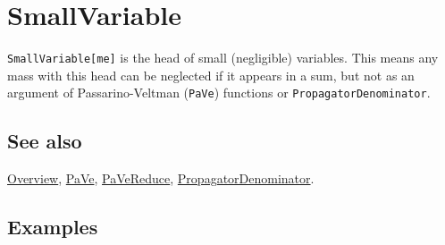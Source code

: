 \documentclass[../FeynCalcManual.tex]{subfiles}
\begin{document}
\hypertarget{smallvariable}{%
\section{SmallVariable}\label{smallvariable}}

\texttt{SmallVariable[\allowbreak{}me]} is the head of small
(negligible) variables. This means any mass with this head can be
neglected if it appears in a sum, but not as an argument of
Passarino-Veltman (\texttt{PaVe}) functions or
\texttt{PropagatorDenominator}.

\subsection{See also}

\hyperlink{toc}{Overview}, \hyperlink{pave}{PaVe},
\hyperlink{pavereduce}{PaVeReduce},
\hyperlink{propagatordenominator}{PropagatorDenominator}.

\subsection{Examples}
\end{document}
